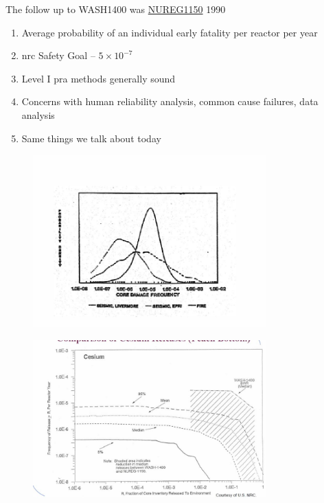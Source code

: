 \documentclass[aspectratio=1610,pdftex,dvipsnames,compress,xcolor={dvipsnames}]{beamer}
\newcommand{\acs}{\acrshort} %
\begin{document}
\begin{frame}{The follow up to WASH1400 was \href{https://uidaho.pressbooks.pub/riskassessment/chapter/pra-2/}{NUREG1150} 1990}
    \begin{enumerate}[series=outerlist,topsep=0pt,itemsep=21pt,leftmargin=*,label=(\arabic*)]
        \item[]Average probability of an individual early fatality per reactor per year
        \item[]\acs{nrc} Safety Goal -- $5 \times 10^{-7}$
        \item[]Level I \acs{pra} methods generally sound
        \item[]Concerns with human reliability analysis, common cause failures, data analysis
        \item[]Same things we talk about today
    \end{enumerate}
\end{frame}


\begin{frame}{}
    \begin{figure}
        \centering
        \includegraphics[width=0.80\textwidth]{cdf.jpg}
    \end{figure}
\end{frame}


\begin{frame}{}
    \begin{figure}
        \centering
        \includegraphics[width=0.80\textwidth]{cesium.release.jpg}
    \end{figure}
\end{frame}
\end{document}
